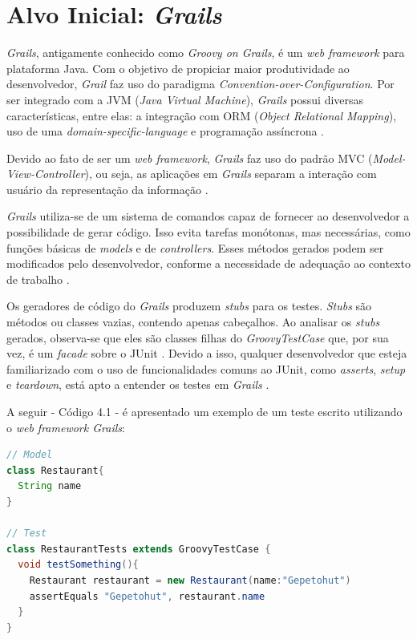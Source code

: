 \section{Alvo Inicial: \textit{Grails}} 
\textit{Grails}, antigamente conhecido como \textit{Groovy on Grails}, é um \textit{web framework} para plataforma Java. Com o objetivo de propiciar maior produtividade ao desenvolvedor, \textit{Grail} faz uso do paradigma \textit{Convention-over-Configuration}.  Por ser integrado com a JVM (\textit{Java Virtual Machine}), \textit{Grails} possui diversas características, entre elas: a integração com ORM (\textit{Object Relational Mapping}), uso de uma \textit{domain-specific-language} e programação assíncrona \cite{grails2015}.
\par
\indent Devido ao fato de ser um \textit{web framework}, \textit{Grails} faz uso do padrão MVC (\textit{Model-View-Controller}), ou seja, as aplicações em \textit{Grails} separam a interação com usuário da representação da informação \cite{grails2015}.
\par
\indent \textit{Grails} utiliza-se de um sistema de comandos capaz de fornecer ao desenvolvedor a possibilidade de gerar código. Isso evita tarefas monótonas, mas necessárias, como funções básicas de \textit{models} e de \textit{controllers}. Esses métodos gerados podem ser modificados pelo desenvolvedor, conforme a necessidade de adequação ao contexto de trabalho  \cite{grails2015}.
\par
\indent Os geradores de código do \textit{Grails} produzem  \textit{stubs} para os testes. \textit{Stubs} são métodos ou classes vazias, contendo apenas cabeçalhos. Ao analisar os \textit{stubs} gerados, observa-se que eles são classes filhas do \textit{GroovyTestCase} que, por sua vez, é um \textit{facade} sobre o JUnit \cite{broughton2010}. Devido a isso, qualquer desenvolvedor que esteja familiarizado com o uso de funcionalidades comuns ao JUnit, como \textit{asserts}, \textit{setup} e \textit{teardown}, está apto a entender os testes em \textit{Grails} \cite{broughton2010}.
\par
\indent A seguir - Código 4.1 - é apresentado um exemplo de um teste escrito utilizando o \textit{web framework Grails}:

\begin{lstlisting}[language=java, label=exTesteGrails, caption={Exemplo de Teste em \textit{Grails}}]
// Model
class Restaurant{
  String name
}

// Test
class RestaurantTests extends GroovyTestCase {
  void testSomething(){
    Restaurant restaurant = new Restaurant(name:"Gepetohut")
    assertEquals "Gepetohut", restaurant.name
  }
}
\end{lstlisting}

